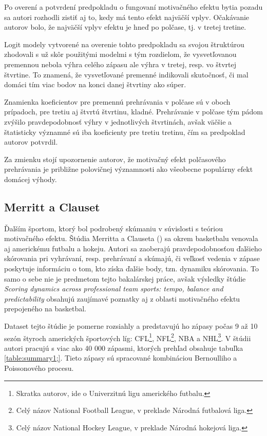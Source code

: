 \documentclass[
  digital, %
  twoside, %
  notable,   %
  lof,     %
  lot,     %
]{fithesis3}
\begin{document}
		Po overení a potvrdení predpokladu o fungovaní motivačného efektu bytia pozadu sa autori rozhodli zistiť aj to, kedy má tento efekt najväčší vplyv. Očakávanie autorov bolo, že najväčší vplyv efektu je hneď po polčase, tj. v tretej tretine.
		
		Logit modely vytvorené na overenie tohto predpokladu sa svojou štruktúrou zhodovali s už skôr použitými modelmi s tým rozdielom, že vysvetľovanou premennou nebola výhra celého zápasu ale výhra v tretej, resp. vo štvrtej štvrtine. To znamená, že vysvetľované premenné indikovali skutočnosť, či mal domáci tím viac bodov na konci danej štvrtiny ako súper. 
		
		Znamienka koeficientov pre premennú prehrávania v polčase sú v oboch prípadoch, pre tretiu aj štvrtú štvrtinu, kladné. Prehrávanie v polčase tým pádom zvýšilo pravdepodobnosť výhry v jednotlivých štvrtinách, avšak väčšie a štatisticky významné sú iba koeficienty pre tretiu tretinu, čím sa predpoklad autorov potvrdil. \parencite[s.~822]{berger2011}		
			
		Za zmienku stojí upozornenie autorov, že motivačný efekt polčasového prehrávania je približne polovičnej významnosti ako všeobecne populárny efekt domácej výhody.

		\subsection{Merritt a Clauset}
		Ďalším športom, ktorý bol podrobený skúmaniu v súvislosti s teóriou motivačného efektu. Štúdia Merritta a Clauseta (\citeyear{merritt2014}) sa okrem basketbalu venovala aj americkému futbalu a hokeju. Autori sa zaoberajú pravdepodobnosťou ďalšieho skórovania pri vyhrávaní, resp. prehrávaní a skúmajú, či veľkosť vedenia v zápase poskytuje informáciu o tom, kto získa ďalšie body, tzn. dynamiku skórovania. To samo o sebe nie je predmetom tejto bakalárskej práce, avšak výsledky štúdie \textit{Scoring dynamics across professional team sports: tempo, balance and predictability} obsahujú zaujímavé poznatky aj z oblasti motivačného efektu prepojeného na basketbal.
		
		Dataset tejto štúdie je pomerne rozsiahly a predstavujú ho zápasy počas 9 až 10  sezón štyroch amerických športových líg: CFL\footnote{Skratka autorov, ide o Univerzitnú ligu amerického futbalu.}, NFL\footnote{Celý názov National Football League, v preklade Národná futbalová liga.}, NBA a NHL\footnote{Celý názov National Hockey League, v preklade Národná hokejová liga.}. V štúdii autori pracujú s viac ako 40 000 zápasmi, ktorých prehľad obsahuje tabuľka \ref{table:summary1;}. Tieto zápasy sú spracované kombináciou Bernoulliho a Poissonového procesu.
	
\end{document}
